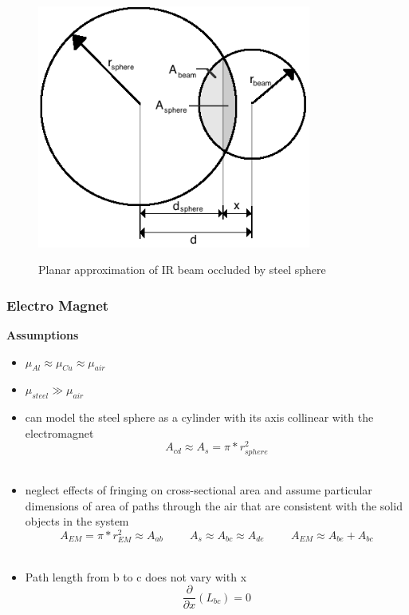 \documentclass{article}
\theoremstyle{plain}
\theoremstyle{definition}
\theoremstyle{remark}
\begin{document}
\begin{figure}
\begin{center}
\includegraphics[width = 9cm]{beam_sphere_diagram.png}
\label{P2Q1_a1}
\caption{Planar approximation of IR beam occluded by steel sphere}
\end{center}
\end{figure}

\subsubsection{Electro Magnet}
\textbf{Assumptions}
\begin{itemize}
\item $ \mu_{Al} \approx \mu_{Cu} \approx \mu_{air} $ \\
\item $ \mu_{steel} \gg \mu_{air} $ \\
\item can model the steel sphere as a cylinder with its axis collinear with the electromagnet  \\ 
$$A_{cd} \approx A_{s} = \pi * r_{sphere}^2 $$ \\
\item neglect effects of fringing on cross-sectional area and assume particular dimensions of area of paths through the air that are consistent with the solid objects in the system \\
$$ A_{EM} = \pi*r_{EM}^2 \approx A_{ab} \hspace{1cm} A_{s} \approx A_{bc} \approx A_{de} \hspace{1cm} A_{EM} \approx A_{be} + A_{bc} $$ \\
\item Path length from b to c does not vary with x \\
$$ \frac{\partial}{\partial x} (L_{bc}) = 0$$ \\
\end{itemize}
\end{document}
